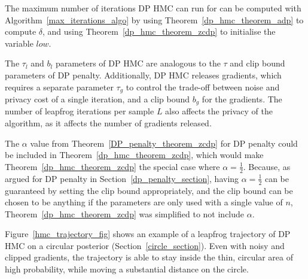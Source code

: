\documentclass[english,twoside,openright]{HYgraduMLDS}
\begin{document}
The maximum number of iterations DP HMC can run for can be computed with
Algorithm~\ref{max_iterations_algo} by using Theorem~\ref{dp_hmc_theorem_adp}
to compute \(\delta\), and using Theorem~\ref{dp_hmc_theorem_zcdp}
to initialise the variable \(low\).

The \(\tau_{l}\) and \(b_{l}\) parameters of DP HMC are analogous to the
\(\tau\) and clip bound parameters of DP penalty. Additionally, DP HMC
releases gradients, which requires a separate parameter \(\tau_{g}\) to
control the trade-off between noise and privacy cost of a single iteration,
and a clip bound \(b_{g}\) for the gradients. The number of leapfrog iterations
per sample \(L\) also affects the privacy of the algorithm, as it affects the
number of gradients released.

The \(\alpha\) value from Theorem~\ref{DP_penalty_theorem_zcdp} for
DP penalty could be included in Theorem~\ref{dp_hmc_theorem_zcdp},
which would make Theorem~\ref{dp_hmc_theorem_zcdp} the special case where
\(\alpha = \frac{1}{2}\). Because, as argued for DP penalty in
Section~\ref{dp_penalty_section}, having \(\alpha = \frac{1}{2}\) can be
guaranteed by setting the clip bound appropriately, and the clip bound can
be chosen to be anything if the parameters are only used with a single value
of \(n\),
Theorem~\ref{dp_hmc_theorem_zcdp} was simplified to not include \(\alpha\).

Figure~\ref{hmc_trajectory_fig} shows an example of a leapfrog trajectory
of DP HMC on a circular posterior (Section~\ref{circle_section}).
Even with noisy and clipped gradients,
the trajectory is able to stay inside the thin, circular area of high probability,
while moving a substantial distance on the circle.
\end{document}

